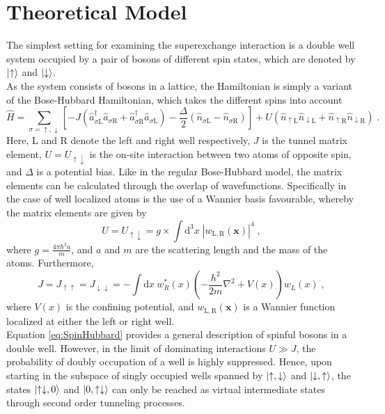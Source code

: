 \section{Theoretical Model}
The simplest setting for examining the superexchange interaction is a double well system occupied by a pair of bosons of different spin states, which are denoted by $\ket{\uparrow}$ and $\ket{\downarrow}$.\\
As the system consists of bosons in a lattice, the Hamiltonian is simply a variant of the Bose-Hubbard Hamiltonian, which takes the different spins into account
\begin{equation}
	\hat{H} = \sum_{\sigma = \uparrow , \downarrow} \left[ -J \left( \hat{a}_{\sigma \mathrm{L}}^{\dag} \hat{a}_{\sigma \mathrm{R}} + \hat{a}_{\sigma \mathrm{R}}^{\dag} \hat{a}_{\sigma \mathrm{L}} \right) - \frac{\Delta}{2} \left( \hat{n}_{\sigma \mathrm{L}} - \hat{n}_{\sigma \mathrm{R}} \right)   \right] + U \left( \hat{n}_{\uparrow \mathrm{L}} \hat{n}_{\downarrow \mathrm{L}} + \hat{n}_{\uparrow \mathrm{R}} \hat{n}_{\downarrow \mathrm{R}} \right) \; . \label{eq:SpinHubbard}
\end{equation}
Here, L and R denote the left and right well respectively, $J$ is the tunnel matrix element, $U = U_{\uparrow \downarrow}$ is the on-site interaction between two atoms of opposite spin, and $\Delta$ is a potential bias. Like in the regular Bose-Hubbard model, the matrix elements can be calculated through the overlap of wavefunctions. Specifically in the case of well localized atoms is the use of a Wannier basis favourable, whereby the matrix elements are given by 
\begin{equation}
	U = U_{\uparrow \downarrow} = g \times \int \mathrm{d}^3 x \; |w_{\mathrm{L},\mathrm{R}} (\boldsymbol{x})|^4 \; ,
\end{equation} 
where $g = \frac{4 \pi \hbar^2 a}{m}$, and $a$ and $m$ are the scattering length and the mass of the atoms. Furthermore,
\begin{equation}
	J = J_{\uparrow\uparrow} = J_{\downarrow\downarrow} = - \int \mathrm{d}x \ w_{R}^*(x) \left( - \frac{\hbar^2}{2 m} \nabla ^2 + V(x) \right) w_{L}(x) \; ,
\end{equation}
where $V(x)$ is the confining potential, and $w_{\mathrm{L},\mathrm{R}} (\boldsymbol{x})$ is a Wannier function localized at either the left or right well.\\
Equation \eqref{eq:SpinHubbard} provides a general description of spinful bosons in a double well. However, in the limit of dominating interactions $U \gg J$, the probability of doubly occupation of a well is highly suppressed. Hence, upon starting in the subspace of singly occupied wells spanned by $\ket{\uparrow,\downarrow}$ and $\ket{\downarrow,\uparrow}$, the states $\ket{\uparrow \downarrow, 0}$ and $\ket{0, \uparrow \downarrow}$ can only be reached as virtual intermediate states through second order tunneling processes.
